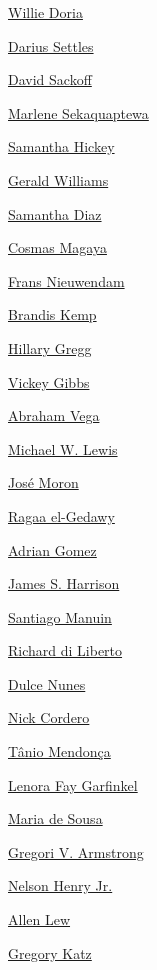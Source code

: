 \protect\hyperlink{willie-doria}{Willie Doria}

\protect\hyperlink{darius-settles}{Darius Settles}

\protect\hyperlink{david-sackoff}{David Sackoff}

\protect\hyperlink{marlene-sekaquaptewa}{Marlene Sekaquaptewa}

\protect\hyperlink{samantha-hickey}{Samantha Hickey}

\protect\hyperlink{gerald-williams}{Gerald Williams}

\protect\hyperlink{samantha-diaz}{Samantha Diaz}

\protect\hyperlink{cosmas-magaya}{Cosmas Magaya}

\protect\hyperlink{frans-nieuwendam}{Frans Nieuwendam}

\protect\hyperlink{brandis-kemp}{Brandis Kemp}

\protect\hyperlink{hillary-gregg}{Hillary Gregg}

\protect\hyperlink{vickey-gibbs}{Vickey Gibbs}

\protect\hyperlink{abraham-vega}{Abraham Vega}

\protect\hyperlink{michael-w-lewis}{Michael W. Lewis}

\protect\hyperlink{josuxe9-moron}{José Moron}

\protect\hyperlink{ragaa-elgedawy}{Ragaa el-Gedawy}

\protect\hyperlink{adrian-gomez}{Adrian Gomez}

\protect\hyperlink{james-s-harrison}{James S. Harrison}

\protect\hyperlink{santiago-manuin}{Santiago Manuin}

\protect\hyperlink{richard-di-liberto-}{Richard di Liberto}

\protect\hyperlink{dulce-nunes}{Dulce Nunes}

\protect\hyperlink{nick-cordero}{Nick Cordero}

\protect\hyperlink{tuxe2nio-mendonuxe7a}{Tânio Mendonça}

\protect\hyperlink{lenora-fay-garfinkel}{Lenora Fay Garfinkel}

\protect\hyperlink{maria-de-sousa}{Maria de Sousa}

\protect\hyperlink{gregori-v-armstrong}{Gregori V. Armstrong}

\protect\hyperlink{nelson-henry-jr}{Nelson Henry Jr.}

\protect\hyperlink{allen-lew}{Allen Lew}

\protect\hyperlink{gregory-katz}{Gregory Katz}

